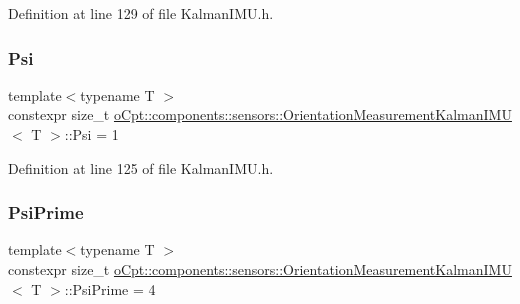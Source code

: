 Definition at line 129 of file Kalman\+I\+M\+U.\+h.

\hypertarget{classo_cpt_1_1components_1_1sensors_1_1_orientation_measurement_kalman_i_m_u_aef93336f198ae514a96a43290cfe596a}{}\label{classo_cpt_1_1components_1_1sensors_1_1_orientation_measurement_kalman_i_m_u_aef93336f198ae514a96a43290cfe596a} 
\subsubsection{\texorpdfstring{Psi}{Psi}}
{\footnotesize\ttfamily template$<$typename T $>$ \\
constexpr size\+\_\+t \hyperlink{classo_cpt_1_1components_1_1sensors_1_1_orientation_measurement_kalman_i_m_u}{o\+Cpt\+::components\+::sensors\+::\+Orientation\+Measurement\+Kalman\+I\+MU}$<$ T $>$\+::Psi = 1\hspace{0.3cm}{\ttfamily [static]}}



Definition at line 125 of file Kalman\+I\+M\+U.\+h.

\hypertarget{classo_cpt_1_1components_1_1sensors_1_1_orientation_measurement_kalman_i_m_u_ae77939527f42ab7e44eae8493bb0ab37}{}\label{classo_cpt_1_1components_1_1sensors_1_1_orientation_measurement_kalman_i_m_u_ae77939527f42ab7e44eae8493bb0ab37} 
\subsubsection{\texorpdfstring{Psi\+Prime}{PsiPrime}}
{\footnotesize\ttfamily template$<$typename T $>$ \\
constexpr size\+\_\+t \hyperlink{classo_cpt_1_1components_1_1sensors_1_1_orientation_measurement_kalman_i_m_u}{o\+Cpt\+::components\+::sensors\+::\+Orientation\+Measurement\+Kalman\+I\+MU}$<$ T $>$\+::Psi\+Prime = 4\hspace{0.3cm}{\ttfamily [static]}}




